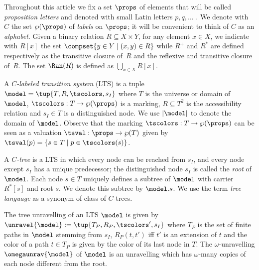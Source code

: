 Throughout this article we fix a set $\props$ of elements that will be called
\emph{proposition letters} and denoted with small Latin letters $p, q, \ldots$ .
We denote with $C$ the set $\wp (\props)$ of \emph{labels} on $\props$; it will be
convenient to think of $C$ as an \emph{alphabet}.
Given a binary relation $R \subseteq X \times Y$, for any element $x \in X$,
we indicate with $R[x]$ the set $\compset{ y \in Y \mid (x,y) \in R}$ while $R^+$
and $R^{*}$ are defined respectively as the transitive closure of~$R$ and
the reflexive and transitive closure of~$R$. The set $\Ran(R)$ is defined as $\bigcup_{x\in X}R[x]$.

A \emph{$C$-labeled transition system} (LTS) is a tuple $\model = \tup{T,R,\tscolors,s_I}$ where
$T$ is the universe or domain of $\model$, $\tscolors:T\to\wp(\props)$ is a marking,
$R\subseteq T^2$ is the accessibility relation and $s_I \in T$ is a distinguished node.
We use $|\model|$ to denote the domain of $\model$.
%
Observe that the marking ${\tscolors:T\to\wp(\props)}$ can be seen as a valuation $\tsval:\props\to\wp (T)$ given by $\tsval(p) = \{s \in T \mid p\in \tscolors(s)\}$.



%
A \emph{$C$-tree} is a LTS in which every node can
be reached from $s_I$, and every node except $s_I$ has a unique predecessor;
the distinguished node $s_I$ is called the \emph{root} of $\model$.
Each node $s \in T$ uniquely defines a subtree of $\model$ with carrier
$R^{*}[s]$ and root $s$. We denote this subtree by ${\model.s}$.
We use the term \emph{tree language} as a synonym of class of $C$-trees.

The tree unravelling of an LTS $\model$ is given by $\unravel{\model} := \tup{T_P,R_P,\tscolors',s_I}$ where $T_P$ is the set of finite paths in $\model$ stemming from $s_I$, $R_P(t,t')$ iff $t'$ is an extension of $t$ and the color of a path $t\in T_P$ is given by the color of its last node in $T$. The $\omega$-unravelling $\omegaunrav{\model}$ of $\model$ is an unravelling which has $\omega$-many copies of each node different from the root.

